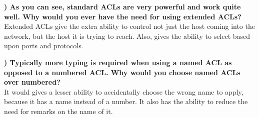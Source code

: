 \documentclass{report}
\newcommand{\mysubsection}[2]{\textbf{\romannumeral #1) #2}}
\begin{document}
\mysubsection{1}{As you can see, standard ACLs are very powerful and work quite
well. Why would you ever have the need for using extended ACLs?}\\
Extended ACLs give the extra ability to control not just the host coming into
the network, but the host it is trying to reach. Also, gives the ability to
select based upon ports and protocols.

\noindent\mysubsection{2}{Typically more typing is required when using a named
ACL as opposed to a numbered ACL. Why would you choose named ACLs over
numbered?}\\
It would gives a lesser ability to accidentally choose the wrong name to
apply, because it has a name instead of a number. It also has the ability to
reduce the need for remarks on the name of it.

\end{document}
